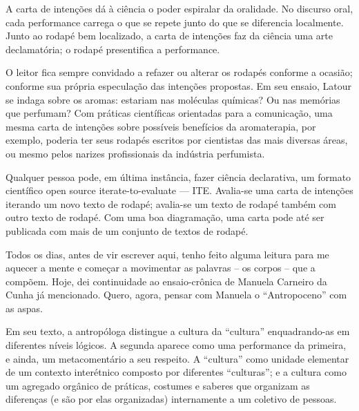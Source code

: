 A carta de intenções dá à ciência o poder espiralar da oralidade. No discurso oral, cada performance carrega o que se repete junto do que se diferencia localmente. Junto ao rodapé bem localizado, a carta de intenções faz da ciência uma arte declamatória; o rodapé  presentifica a performance.

O leitor fica sempre convidado a refazer ou alterar os rodapés conforme a ocasião; conforme sua própria especulação das intenções propostas. Em seu ensaio, Latour se indaga sobre os aromas: estariam nas moléculas químicas? Ou nas memórias que perfumam? Com práticas científicas orientadas para a comunicação, uma mesma carta de intenções sobre possíveis benefícios da aromaterapia, por exemplo, poderia ter seus rodapés escritos por cientistas das mais diversas áreas, ou mesmo pelos narizes profissionais da indústria perfumista.

Qualquer pessoa pode, em última instância, fazer ciência declarativa, um formato científico open source iterate-to-evaluate --- ITE. Avalia-se uma carta de intenções iterando um novo texto de rodapé; avalia-se um texto de rodapé também com outro texto de rodapé. Com uma boa diagramação, uma carta pode até ser publicada com mais de um conjunto de textos de rodapé.


Todos os dias, antes de vir escrever aqui, tenho feito alguma leitura para me aquecer a mente e começar a movimentar as palavras -- os corpos -- que a compõem. Hoje, dei continuidade ao ensaio-crônica de Manuela Carneiro da Cunha já mencionado. Quero, agora, pensar com Manuela o \enquote{Antropoceno} com as aspas.

Em seu texto, a antropóloga distingue a cultura da \enquote{cultura} enquadrando-as em diferentes níveis lógicos. A segunda aparece como uma performance da primeira, e ainda, um metacomentário a seu respeito. A \enquote{cultura} como unidade elementar de um contexto interétnico composto por diferentes \enquote{culturas}; e a cultura como um agregado orgânico de práticas, costumes e saberes que organizam as diferenças (e são por elas organizadas) internamente a um coletivo de pessoas.

